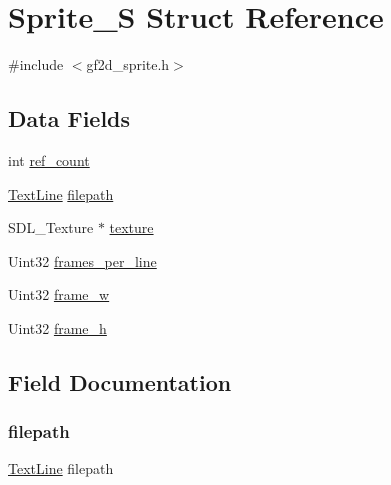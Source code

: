 \hypertarget{struct_sprite___s}{}\section{Sprite\+\_\+S Struct Reference}
\label{struct_sprite___s}


{\ttfamily \#include $<$gf2d\+\_\+sprite.\+h$>$}

\subsection*{Data Fields}
\begin{DoxyCompactItemize}
\item 
int \hyperlink{struct_sprite___s_a223a278e0bf3b42ae887efe07bfbeac0}{ref\+\_\+count}
\item 
\hyperlink{gf2d__text_8h_ab8032ef74d59a9d782ebff6a3bdee62f}{Text\+Line} \hyperlink{struct_sprite___s_aa46214e506fc1ef9236b3fe0e4e41a0a}{filepath}
\item 
S\+D\+L\+\_\+\+Texture $\ast$ \hyperlink{struct_sprite___s_a859b8efbf9abe8e82757ee5c75a0c97c}{texture}
\item 
Uint32 \hyperlink{struct_sprite___s_a19843a4e1d9b3143959c79e7eca1aa22}{frames\+\_\+per\+\_\+line}
\item 
Uint32 \hyperlink{struct_sprite___s_aa48f01e42f02ba2e317d7fd0b2a7e466}{frame\+\_\+w}
\item 
Uint32 \hyperlink{struct_sprite___s_ad025fb89dae766e4967a233dbfd03759}{frame\+\_\+h}
\end{DoxyCompactItemize}


\subsection{Field Documentation}
\mbox{\label{struct_sprite___s_aa46214e506fc1ef9236b3fe0e4e41a0a}} 
\subsubsection{\texorpdfstring{filepath}{filepath}}
{\footnotesize\ttfamily \hyperlink{gf2d__text_8h_ab8032ef74d59a9d782ebff6a3bdee62f}{Text\+Line} filepath}

\mbox{\label{struct_sprite___s_ad025fb89dae766e4967a233dbfd03759}} 
